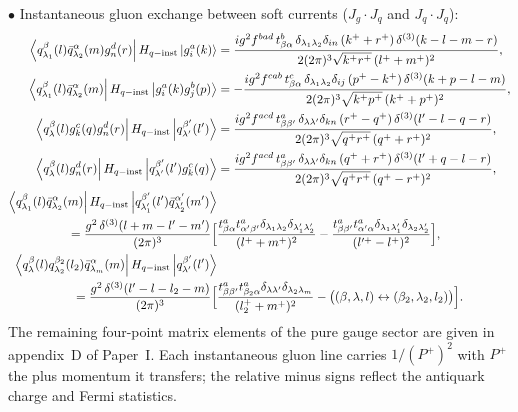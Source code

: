 \documentclass[11pt,a4paper]{article}
\numberwithin{equation}{section}
\newcommand{\dthree}{\delta^{(3)}}
\newcommand{\ket}[1]{\left|#1\right\rangle}
\newcommand{\bra}[1]{\left\langle#1\right|}
\newcommand{\qk}[3]{q^{#1}_{#2}(#3)}
\newcommand{\aqk}[3]{\bar q^{#1}_{#2}(#3)}
\newcommand{\gl}[3]{g^{#1}_{#2}(#3)}
\begin{document}
$\bullet$ Instantaneous gluon exchange between soft currents ($J_{g}\cdot J_{q}$ and $J_{q}\cdot J_{q}$):
{\small\begin{align}
\bra{\qk{\beta}{\lambda_{1}}{l}\aqk{\alpha}{\lambda_{2}}{m}\gl{d}{n}{r}}H_{q-{\rm inst}}\ket{\gl{a}{i}{k}}&=
\frac{ig^{2}f^{bad}\,t^{b}_{\beta\alpha}\,\delta_{\lambda_{1}\lambda_{2}}\delta_{in}\,(k^{+}+r^{+})\,\dthree(k-l-m-r)}
{2(2\pi)^{3}\sqrt{k^{+}r^{+}}\,(l^{+}+m^{+})^{2}},
\label{eq:MEJJ1}\\
\bra{\qk{\beta}{\lambda_{1}}{l}\aqk{\alpha}{\lambda_{2}}{m}}H_{q-{\rm inst}}\ket{\gl{a}{i}{k}\gl{b}{j}{p}}&=
-\frac{ig^{2}f^{cab}\,t^{c}_{\beta\alpha}\,\delta_{\lambda_{1}\lambda_{2}}\delta_{ij}\,(p^{+}-k^{+})\,\dthree(k+p-l-m)}
{2(2\pi)^{3}\sqrt{k^{+}p^{+}}\,(k^{+}+p^{+})^{2}},
\label{eq:MEJJ2}\\
\bra{\qk{\beta}{\lambda}{l}\gl{c}{k}{q}\gl{d}{n}{r}}H_{q-{\rm inst}}\ket{\qk{\beta'}{\lambda'}{l'}}&=
\frac{ig^{2}f^{acd}\,t^{a}_{\beta\beta'}\,\delta_{\lambda\lambda'}\delta_{kn}\,(r^{+}-q^{+})\,\dthree(l'-l-q-r)}
{2(2\pi)^{3}\sqrt{q^{+}r^{+}}\,(q^{+}+r^{+})^{2}},
\label{eq:MEJJq2g}\\
\bra{\qk{\beta}{\lambda}{l}\gl{d}{n}{r}}H_{q-{\rm inst}}\ket{\qk{\beta'}{\lambda'}{l'}\gl{c}{k}{q}}&=
\frac{ig^{2}f^{acd}\,t^{a}_{\beta\beta'}\,\delta_{\lambda\lambda'}\delta_{kn}\,(q^{+}+r^{+})\,\dthree(l'+q-l-r)}
{2(2\pi)^{3}\sqrt{q^{+}r^{+}}\,(q^{+}-r^{+})^{2}},
\label{eq:MEJJqg}\\
\bra{\qk{\beta}{\lambda_{1}}{l}\aqk{\alpha}{\lambda_{2}}{m}}H_{q-{\rm inst}}\ket{\qk{\beta'}{\lambda_{1}'}{l'}\aqk{\alpha'}{\lambda_{2}'}{m'}}&
\nonumber\\
=\frac{g^{2}\,\dthree(l+m-l'-m')}{(2\pi)^{3}}\Big[&
\frac{t^{a}_{\beta\alpha}t^{a}_{\alpha'\beta'}\delta_{\lambda_{1}\lambda_{2}}\delta_{\lambda_{1}'\lambda_{2}'}}{(l^{+}+m^{+})^{2}}
-\frac{t^{a}_{\beta\beta'}t^{a}_{\alpha'\alpha}\delta_{\lambda_{1}\lambda_{1}'}\delta_{\lambda_{2}\lambda_{2}'}}{(l'^{+}-l^{+})^{2}}\Big],
\label{eq:MEJJqq}\\
\bra{\qk{\beta}{\lambda}{l}\qk{\beta_{2}}{\lambda_{2}}{l_{2}}\aqk{\alpha}{\lambda_{m}}{m}}H_{q-{\rm inst}}\ket{\qk{\beta'}{\lambda'}{l'}}&
\nonumber\\
=\frac{g^{2}\,\dthree(l'-l-l_{2}-m)}{(2\pi)^{3}}\Big[&
\frac{t^{a}_{\beta\beta'}t^{a}_{\beta_{2}\alpha}\delta_{\lambda\lambda'}\delta_{\lambda_{2}\lambda_{m}}}{(l_{2}^{+}+m^{+})^{2}}
-\big((\beta,\lambda,l)\leftrightarrow(\beta_{2},\lambda_{2},l_{2})\big)\Big].
\label{eq:MEJJqqq}
\end{align}}
The remaining four-point matrix elements of the pure gauge sector are given in appendix~D of
Paper~I. Each instantaneous gluon line carries $1/(P^{+})^{2}$ with $P^{+}$ the plus momentum it
transfers; the relative minus signs reflect the antiquark charge and Fermi statistics.
\end{document}
